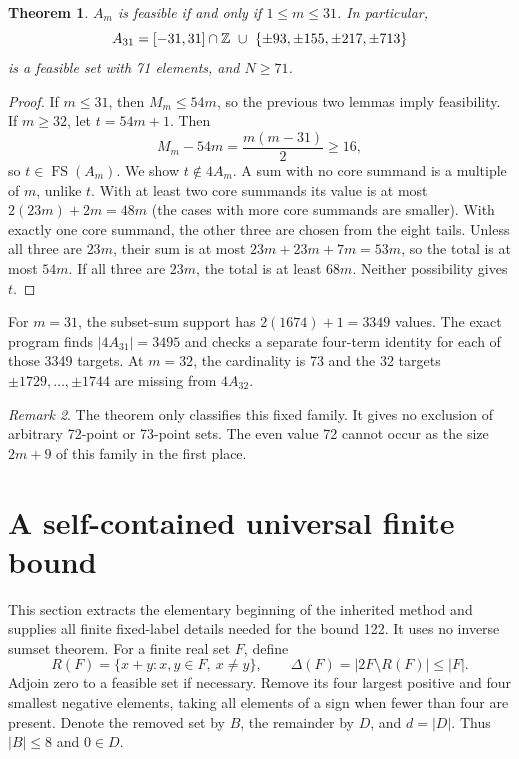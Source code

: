 \documentclass[11pt,a4paper]{article}
\newtheorem{theorem}{Theorem}[section]
\theoremstyle{remark}\newtheorem{remark}[theorem]{Remark}
\newcommand{\FS}{\operatorname{FS}}
\begin{document}
\begin{theorem}\label{thm:family}
$A_m$ is feasible if and only if $1\le m\le31$. In particular,
\[A_{31}=[-31,31]\cap\Z\ \cup\ \{\pm93,\pm155,\pm217,\pm713\}\]
is a feasible set with 71 elements, and $N\ge71$.
\end{theorem}
\begin{proof}
If $m\le31$, then $M_m\le54m$, so the previous two lemmas imply feasibility.
If $m\ge32$, let $t=54m+1$. Then
\[M_m-54m=\frac{m(m-31)}2\ge16,\]
so $t\in\FS(A_m)$. We show $t\notin4A_m$. A sum with no core summand is a multiple of $m$, unlike $t$. With at least two core summands its value is at most $2(23m)+2m=48m$ (the cases with more core summands are smaller). With exactly one core summand, the other three are chosen from the eight tails. Unless all three are $23m$, their sum is at most $23m+23m+7m=53m$, so the total is at most $54m$. If all three are $23m$, the total is at least $68m$. Neither possibility gives $t$.
\end{proof}
For $m=31$, the subset-sum support has $2(1674)+1=3349$ values. The exact program finds $|4A_{31}|=3495$ and checks a separate four-term identity for each of those 3349 targets. At $m=32$, the cardinality is 73 and the 32 targets $\pm1729,\ldots,\pm1744$ are missing from $4A_{32}$.
\begin{remark}
The theorem only classifies this fixed family. It gives no exclusion of arbitrary 72-point or 73-point sets. The even value 72 cannot occur as the size $2m+9$ of this family in the first place.
\end{remark}

\section{A self-contained universal finite bound}
This section extracts the elementary beginning of the inherited method and supplies all finite fixed-label details needed for the bound 122. It uses no inverse sumset theorem.
For a finite real set $F$, define
\[R(F)=\{x+y:x,y\in F,\ x\ne y\},\qquad \Delta(F)=|2F\setminus R(F)|\le|F|.\]
Adjoin zero to a feasible set if necessary. Remove its four largest positive and four smallest negative elements, taking all elements of a sign when fewer than four are present. Denote the removed set by $B$, the remainder by $D$, and $d=|D|$. Thus $|B|\le8$ and $0\in D$.
\end{document}
